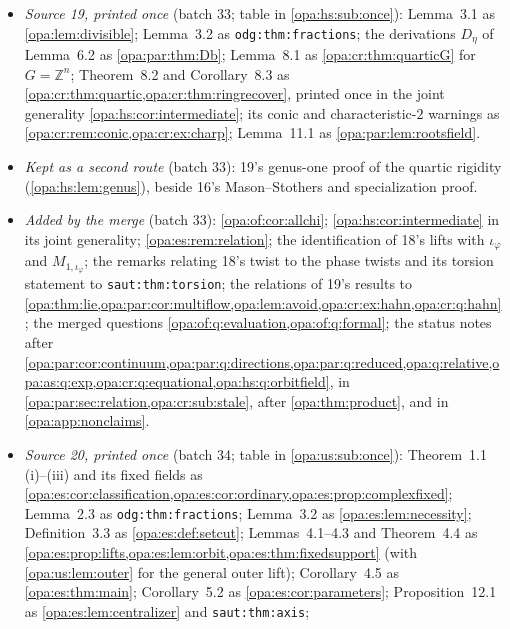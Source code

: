 \documentclass[11pt,oneside]{article}
\numberwithin{equation}{section}
\theoremstyle{definition}
\theoremstyle{remark}
\newcommand{\Z}{\mathbb Z}
\newcommand{\lbl}[1]{\nolinkurl{#1}}
\begin{document}
\begin{itemize}[itemsep=2pt]
\cref{opa:cor:allautos} (its direct floor argument recorded after \cref{opa:es:prop:lifts}); the lifts of Definition~3.1 as $\iota_\varphi$ and
$M_{1,\iota_\varphi}$ (\cref{opa:as:lem:inner}); Lemma~8.2 as \lbl{saut:thm:axis}, with its ring clause printed; the infinite order in
Corollary~6.2 as in \lbl{saut:thm:torsion}; the twist of Proposition~9.1 as the phase twist \lbl{saut:thm:phase}.
\item \emph{Source 19, printed once} (batch 33; table in \cref{opa:hs:sub:once}): Lemma~3.1 as \cref{opa:lem:divisible}; Lemma~3.2 as
\lbl{odg:thm:fractions}; the derivations $D_\eta$ of Lemma~6.2 as \cref{opa:par:thm:Db}; Lemma~8.1 as \cref{opa:cr:thm:quarticG} for
$G=\Z^n$; Theorem~8.2 and Corollary~8.3 as \cref{opa:cr:thm:quartic,opa:cr:thm:ringrecover}, printed once in the joint generality
\cref{opa:hs:cor:intermediate}; its conic and characteristic-$2$ warnings as \cref{opa:cr:rem:conic,opa:cr:ex:charp}; Lemma~11.1 as
\cref{opa:par:lem:rootsfield}.
\item \emph{Kept as a second route} (batch 33): 19's genus-one proof of the quartic rigidity (\cref{opa:hs:lem:genus}), beside 16's
Mason--Stothers and specialization proof.
\item \emph{Added by the merge} (batch 33): \cref{opa:of:cor:allchi}; \cref{opa:hs:cor:intermediate} in its joint generality;
\cref{opa:es:rem:relation}; the identification of 18's lifts with $\iota_\varphi$ and $M_{1,\iota_\varphi}$; the remarks relating 18's twist to
the phase twists and its torsion statement to \lbl{saut:thm:torsion}; the relations of 19's results to
\cref{opa:thm:lie,opa:par:cor:multiflow,opa:lem:avoid,opa:cr:ex:hahn,opa:cr:q:hahn}; the merged questions
\cref{opa:of:q:evaluation,opa:of:q:formal}; the status notes after
\cref{opa:par:cor:continuum,opa:par:q:directions,opa:par:q:reduced,opa:q:relative,opa:as:q:exp,opa:cr:q:equational,opa:hs:q:orbitfield},
in \cref{opa:par:sec:relation,opa:cr:sub:stale}, after \cref{opa:thm:product}, and in \cref{opa:app:nonclaims}.
\item \emph{Source 20, printed once} (batch 34; table in \cref{opa:us:sub:once}): Theorem~1.1 (i)--(iii) and its fixed fields as
\cref{opa:es:cor:classification,opa:es:cor:ordinary,opa:es:prop:complexfixed}; Lemma~2.3 as \lbl{odg:thm:fractions}; Lemma~3.2 as
\cref{opa:es:lem:necessity}; Definition~3.3 as \cref{opa:es:def:setcut}; Lemmas~4.1--4.3 and Theorem~4.4 as
\cref{opa:es:prop:lifts,opa:es:lem:orbit,opa:es:thm:fixedsupport} (with \cref{opa:us:lem:outer} for the general outer lift); Corollary~4.5 as
\cref{opa:es:thm:main}; Corollary~5.2 as \cref{opa:es:cor:parameters}; Proposition~12.1 as \cref{opa:es:lem:centralizer} and \lbl{saut:thm:axis};

\end{itemize}
\end{document}
